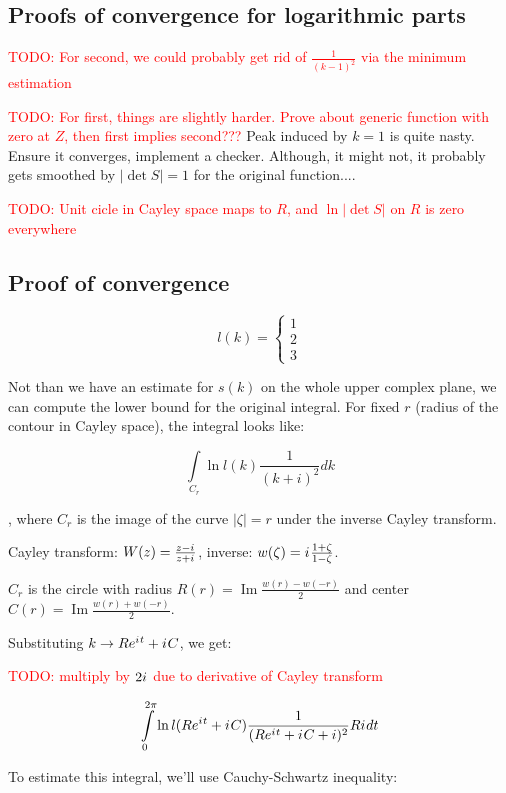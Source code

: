 \documentclass[12pt, a4paper]{article}
\newcommand{\abs}[1]{\left| #1 \right|}
\newcommand{\eexp}[1]{e^{#1}}
\newcommand{\iu}{{i\mkern1mu}}
\renewcommand{\Im}{\operatorname{Im}}
\newcommand{\todo}[1]{{\large \textcolor{red}{TODO: #1}}}
\begin{document}
\subsection*{Proofs of convergence for logarithmic parts}

\todo{For second, we could probably get rid of $\frac{1}{(k-1)^2}$ via the minimum estimation}

\todo{For first, things are slightly harder. Prove about generic function with zero at $Z$, then first implies second???}
Peak induced by $k=1$ is quite nasty. Ensure it converges, implement a checker. Although, it might not, it probably gets smoothed by $\abs{\det S} = 1$ for the original function....


\todo{Unit cicle in Cayley space maps to $R$, and $\ln\abs{\det S}$ on $R$ is zero everywhere}

\subsection*{Proof of convergence}

\[
l(k) =
\begin{cases}
1 \\
2 \\
3 
\end{cases}
\]

Not than we have an estimate for $s(k)$ on the whole upper complex plane, we can compute the lower bound for the original integral. For fixed $r$ (radius of the contour in Cayley space), the integral looks like:

\[
\int\limits_{C_r} \ln l(k) \frac{1}{(k + i)^2} dk
\]

, where $C_r$ is the image of the curve $\abs{\zeta} = r$ under the inverse Cayley transform.

Cayley transform: $W(z) = \frac{z - \iu}{z + \iu}$, inverse: $w(\zeta) = \iu \frac{1 + \zeta}{1 - \zeta}$.

$C_r$ is the circle with radius $R(r) = \Im \frac{w(r) - w(-r)}{2}$ and center $C(r) = \Im \frac{w(r) + w(-r)}{2}$.

Substituting $k \to R \eexp{\iu t} + \iu C$, we get:

\todo{multiply by $2 \iu$ due to derivative of Cayley transform}

\[
\int\limits_{0}^{2 \pi} \ln l(R \eexp{\iu t} + \iu C) \frac{1}{(R \eexp{\iu t} + \iu C + i)^2} R \iu dt
\]

To estimate this integral, we'll use Cauchy-Schwartz inequality:
\end{document}
